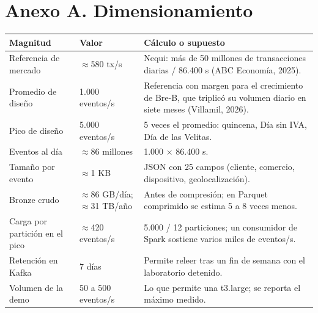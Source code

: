 \documentclass[12pt,letterpaper]{article}
\begin{document}
\section*{Anexo A. Dimensionamiento}
\begin{footnotesize}
\begin{tabular}{@{}P{2.1in}P{1.3in}P{2.9in}@{}}
\toprule
\textbf{Magnitud} & \textbf{Valor} & \textbf{Cálculo o supuesto}\\
\midrule
Referencia de mercado & $\approx$580 tx/s & Nequi: más de 50 millones de transacciones diarias / 86.400 s (ABC Economía, 2025).\\
Promedio de diseño & 1.000 eventos/s & Referencia con margen para el crecimiento de Bre-B, que triplicó su volumen diario en siete meses (Villamil, 2026).\\
Pico de diseño & 5.000 eventos/s & 5 veces el promedio: quincena, Día sin IVA, Día de las Velitas.\\
Eventos al día & $\approx$86 millones & 1.000 $\times$ 86.400 s.\\
Tamaño por evento & $\approx$1 KB & JSON con 25 campos (cliente, comercio, dispositivo, geolocalización).\\
Bronze crudo & $\approx$86 GB/día; $\approx$31 TB/año & Antes de compresión; en Parquet comprimido se estima 5 a 8 veces menos.\\
Carga por partición en el pico & $\approx$420 eventos/s & 5.000 / 12 particiones; un consumidor de Spark sostiene varios miles de eventos/s.\\
Retención en Kafka & 7 días & Permite releer tras un fin de semana con el laboratorio detenido.\\
Volumen de la demo & 50 a 500 eventos/s & Lo que permite una t3.large; se reporta el máximo medido.\\
\bottomrule
\end{tabular}
\end{footnotesize}
\end{document}

